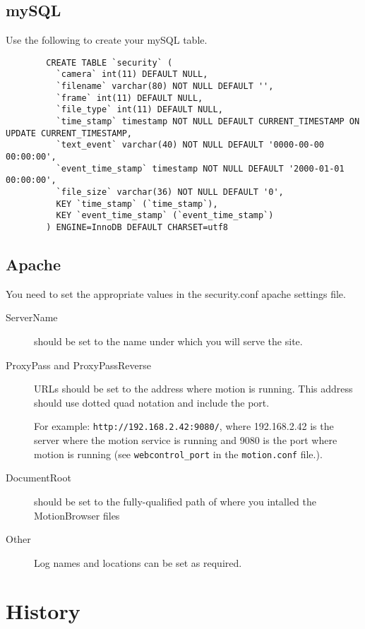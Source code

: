 \documentclass[12pt]{scrartcl} %
\begin{document}
	\subsection{mySQL}
	Use the following to create your mySQL table.

	\begin{verbatim}
		CREATE TABLE `security` (
		  `camera` int(11) DEFAULT NULL,
		  `filename` varchar(80) NOT NULL DEFAULT '',
		  `frame` int(11) DEFAULT NULL,
		  `file_type` int(11) DEFAULT NULL,
		  `time_stamp` timestamp NOT NULL DEFAULT CURRENT_TIMESTAMP ON UPDATE CURRENT_TIMESTAMP,
		  `text_event` varchar(40) NOT NULL DEFAULT '0000-00-00 00:00:00',
		  `event_time_stamp` timestamp NOT NULL DEFAULT '2000-01-01 00:00:00',
		  `file_size` varchar(36) NOT NULL DEFAULT '0',
		  KEY `time_stamp` (`time_stamp`),
		  KEY `event_time_stamp` (`event_time_stamp`)
		) ENGINE=InnoDB DEFAULT CHARSET=utf8
	\end{verbatim}

	\subsection {Apache}
	You need to set the appropriate values in the security.conf apache settings file.
	\begin{description}
		\item [ServerName] should be set to the name under which you will serve the site.
		\item [ProxyPass and ProxyPassReverse] URLs should be set to the address where motion is running. This address should use dotted quad notation and include the port.

			For example: \texttt{http://192.168.2.42:9080/}, where 192.168.2.42 is the server where the motion service is running and 9080 is the port where motion is running (see \texttt{webcontrol\_port} in the \texttt{motion.conf} file.).
		\item[DocumentRoot] should be set to the fully-qualified path of where you intalled the MotionBrowser files
		\item[Other] Log names and locations can be set as required.
	\end{description}



\section{History}
\end{document}
